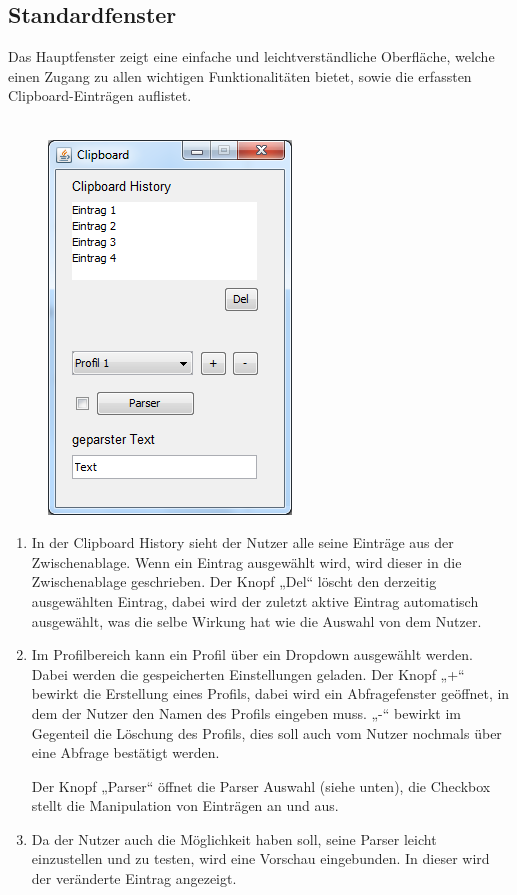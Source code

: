 \documentclass[a4paper,11pt,abstracton,titlepage]{scrartcl}
\begin{document}
\subsection{Standardfenster}
Das Hauptfenster zeigt eine einfache und leichtverständliche Oberfläche, welche
einen Zugang zu allen wichtigen Funktionalitäten bietet, sowie die erfassten
Clipboard-Einträgen auflistet. %
\\\\
\setlength{\intextsep}{-22pt}
\setlength{\abovecaptionskip}{10pt}
\setlength{\belowcaptionskip}{-10pt}
\begin{figure}
	\includegraphics{manager.png}
\end{figure}
\vspace{-45pt}

\begin{enumerate}
	\item In der Clipboard History sieht der Nutzer alle seine Einträge aus
der Zwischenablage. Wenn ein Eintrag ausgewählt wird, wird dieser in die
Zwischenablage geschrieben.
Der Knopf „Del“ löscht den derzeitig ausgewählten Eintrag, dabei wird der
zuletzt aktive Eintrag automatisch ausgewählt, was die selbe Wirkung hat wie die
Auswahl von dem Nutzer.
	\item Im Profilbereich kann ein Profil über ein Dropdown ausgewählt
werden. Dabei werden die gespeicherten Einstellungen geladen.
Der Knopf „+“ bewirkt die Erstellung eines Profils, dabei wird ein
Abfragefenster geöffnet, in dem der Nutzer den Namen des Profils eingeben muss.
„-“ bewirkt im Gegenteil die Löschung des Profils, dies soll auch vom Nutzer
nochmals über eine Abfrage bestätigt werden.

Der Knopf „Parser“ öffnet die Parser Auswahl (siehe unten), die Checkbox stellt die
Manipulation von Einträgen an und aus.
	\item Da der Nutzer auch die Möglichkeit haben soll, seine Parser leicht
einzustellen und zu testen, wird eine Vorschau eingebunden. In dieser wird der
veränderte Eintrag angezeigt.
\end{enumerate}
\end{document}
